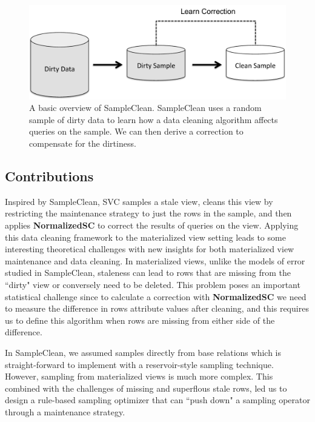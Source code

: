 \begin{figure}[t] \vspace{-2em}
\centering
 \includegraphics[scale=0.30]{figs/sys-arch2.pdf} \vspace{-.25em}
 \caption{A basic overview of SampleClean. SampleClean uses a random sample of dirty data to learn how a data cleaning algorithm affects queries on the sample. We can then derive a correction to compensate for the dirtiness. \label{sc}}\vspace{-1.75em}
\end{figure}

\subsection{Contributions}
Inspired by SampleClean, SVC samples a stale view, cleans this view by restricting the maintenance strategy to just the rows in the sample, and then applies \textbf{NormalizedSC} to correct the results of queries on the view.
Applying this data cleaning framework to the materialized view setting leads to some interesting theoretical challenges with new insights for both materialized view maintenance and data cleaning.
In materialized views, unlike the models of error studied in SampleClean, staleness can lead to rows that are missing from the ``dirty" view or conversely need to be deleted.
This problem poses an important statistical challenge since to calculate a correction with \textbf{NormalizedSC} we need to measure the difference in rows attribute values after cleaning, and this requires us to define this algorithm when rows are missing from either side of the difference.

In SampleClean, we assumed samples directly from base relations which is straight-forward to implement with a reservoir-style sampling technique.
However, sampling from materialized views is much more complex.
This combined with the challenges of missing and superflous stale rows, led us to design a rule-based sampling optimizer that can ``push down" a sampling operator through a maintenance strategy.

